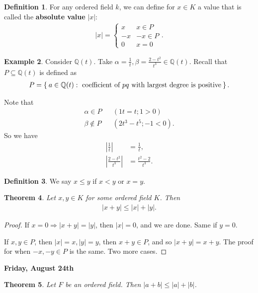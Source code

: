 \documentclass[12pt]{amsbook}
\theoremstyle{plain}
\newtheorem{theorem}{Theorem}[chapter]
\numberwithin{section}{chapter}
\numberwithin{equation}{chapter}
\theoremstyle{definition}
\newtheorem{Def}[theorem]{Definition}
\newtheorem{Ex}[theorem]{Example}
\theoremstyle{remark}
\theoremstyle{plain}
\newcommand{\sub}{\subseteq}
\newcommand{\Q}{\mathbb{Q}}
\newcommand{\bb}{\vspace{3mm}}
\newcommand{\bee}{\begin{equation}\begin{aligned}}
\newcommand{\eee}{\end{aligned}\end{equation}}
\newcommand{\fracc}{\frac}
\renewcommand{\leq}{\leqslant}
\begin{document}
\begin{Def}
For any ordered field $k$, we can define for $x \in K$ a value that is called the \textbf{absolute value} $|x|$:
\bee
|x| = \begin{cases}
x & x \in P\\
-x & -x \in P\\
0 & x = 0
\end{cases}.
\eee
\end{Def}

\begin{Ex}
Consider $\Q(t)$. Take $\alpha = \fracc{1}{t}, \beta = \fracc{2 - t^2}{t^3} \in \Q(t)$. Recall that $P \sub \Q(t)$ is defined as
\bee
P = \Set{a \in \Q(t):\text{ coefficient of }pq\text{ with largest degree is positive}}. 
\eee

Note that
\bee
\alpha \in P && (1t = t; 1>0)\\
\beta \notin P && (2t^3 - t^5; -1 < 0).
\eee
So we have
\bee
\left|\fracc{1}{t} \right| &= \fracc{1}{t},\\
\left|\fracc{2 - t^2}{t^3}\right| &= \fracc{t^2 - 2}{t^3}. 
\eee
\end{Ex}

\begin{Def}
We say $x \leq y$ if $x < y$ or $x = y$. 
\end{Def}

\begin{theorem}
Let $x,y \in K$ for some ordered field $K$. Then \bee
|x + y| \leq |x| + |y|. 
\eee
\end{theorem}

\begin{proof}
If $x = 0 \Rightarrow |x + y| = |y|$, then $|x| = 0$, and we are done. Same if $y = 0$. 

\bb

If $x,y \in P$, then $|x| = x,|y| = y$, then $x + y \in P$, and so $|x + y| = x + y$. The proof for when $-x,-y \in P$ is the same. Two more cases. 
\end{proof}

\textbf{Friday, August 24th}

\begin{theorem}
Let $F$ be an ordered field. Then $|a + b| \leq |a| + |b|$. 
\end{theorem}
\end{document}
